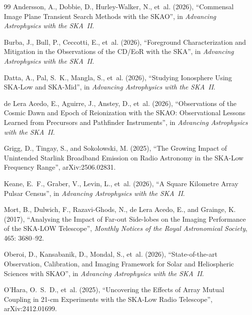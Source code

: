 \documentclass[11pt,a4paper]{article}
\begin{document}
\normalsize
\begin{thebibliography}{99}
Andersson, A., Dobbie, D., Hurley-Walker, N., et~al. (2026), \enquote{Commensal Image Plane Transient Search Methods with the SKAO}, in \emph{Advancing Astrophysics with the SKA~II}.

Burba, J., Bull, P., Ceccotti, E., et~al. (2026), \enquote{Foreground Characterization and Mitigation in the Observations of the CD/EoR with the SKA}, in \emph{Advancing Astrophysics with the SKA~II}.

Datta, A., Pal, S.~K., Mangla, S., et~al. (2026), \enquote{Studying Ionosphere Using SKA-Low and SKA-Mid}, in \emph{Advancing Astrophysics with the SKA~II}.

de Lera Acedo, E., Aguirre, J., Anstey, D., et~al. (2026), \enquote{Observations of the Cosmic Dawn and Epoch of Reionization with the SKAO: Observational Lessons Learned from Precursors and Pathfinder Instruments}, in \emph{Advancing Astrophysics with the SKA~II}.

Grigg, D., Tingay, S., and Sokolowski, M. (2025), \enquote{The Growing Impact of Unintended Starlink Broadband Emission on Radio Astronomy in the SKA-Low Frequency Range}, arXiv:2506.02831.

Keane, E.~F., Graber, V., Levin, L., et~al. (2026), \enquote{A Square Kilometre Array Pulsar Census}, in \emph{Advancing Astrophysics with the SKA~II}.

Mort, B., Dulwich, F., Razavi-Ghods, N., de Lera Acedo, E., and Grainge, K. (2017), \enquote{Analysing the Impact of Far-out Side-lobes on the Imaging Performance of the SKA-LOW Telescope}, \emph{Monthly Notices of the Royal Astronomical Society}, 465: 3680--92.

Oberoi, D., Kansabanik, D., Mondal, S., et~al. (2026), \enquote{State-of-the-art Observation, Calibration, and Imaging Framework for Solar and Heliospheric Sciences with SKAO}, in \emph{Advancing Astrophysics with the SKA~II}.

O'Hara, O.~S.~D., et~al. (2025), \enquote{Uncovering the Effects of Array Mutual Coupling in 21-cm Experiments with the SKA-Low Radio Telescope}, arXiv:2412.01699.


\end{thebibliography}
\end{document}
